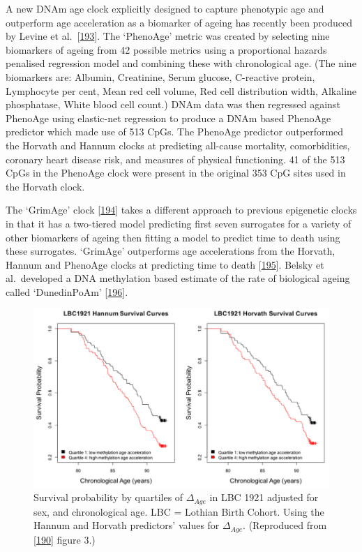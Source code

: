 \documentclass[
]{book}
\begin{document}
A new DNAm age clock explicitly designed to capture phenotypic age and outperform age acceleration as a biomarker of ageing has recently been produced by Levine et al.~{[}\protect\hyperlink{ref-Levine2018}{193}{]}.
The `PhenoAge' metric was created by selecting nine biomarkers of ageing from 42 possible metrics using a proportional hazards penalised regression model and combining these with chronological age.
(The nine biomarkers are: Albumin, Creatinine, Serum glucose, C-reactive protein, Lymphocyte per cent, Mean red cell volume, Red cell distribution width, Alkaline phosphatase, White blood cell count.)
DNAm data was then regressed against PhenoAge using elastic-net regression to produce a DNAm based PhenoAge predictor which made use of 513 CpGs.
The PhenoAge predictor outperformed the Horvath and Hannum clocks at predicting all-cause mortality, comorbidities, coronary heart disease risk, and measures of physical functioning.
41 of the 513 CpGs in the PhenoAge clock were present in the original 353 CpG sites used in the Horvath clock.

The `GrimAge' clock {[}\protect\hyperlink{ref-Lu2019}{194}{]} takes a different approach to previous epigenetic clocks in that it has a two-tiered model predicting first seven surrogates for a variety of other biomarkers of ageing then fitting a model to predict time to death using these surrogates.
`GrimAge' outperforms age accelerations from the Horvath, Hannum and PhenoAge clocks at predicting time to death {[}\protect\hyperlink{ref-Halloran2020}{195}{]}. Belsky et al.~developed a DNA methylation based estimate of the rate of biological ageing called `DunedinPoAm' {[}\protect\hyperlink{ref-Belsky2020}{196}{]}.

\begin{figure}

{\centering \includegraphics[width=0.8\linewidth]{figs/Marioni2015f3} 

}

\caption{Survival probability by quartiles of \(\Delta_{Age}\) in LBC 1921 adjusted for sex, and chronological age. LBC = Lothian Birth Cohort. Using the Hannum and Horvath predictors' values for \(\Delta_{Age}\). (Reproduced from {[}\protect\hyperlink{ref-Marioni2015}{190}{]} figure 3.)}\label{fig:Marioni2015f3}
\end{figure}
\end{document}
